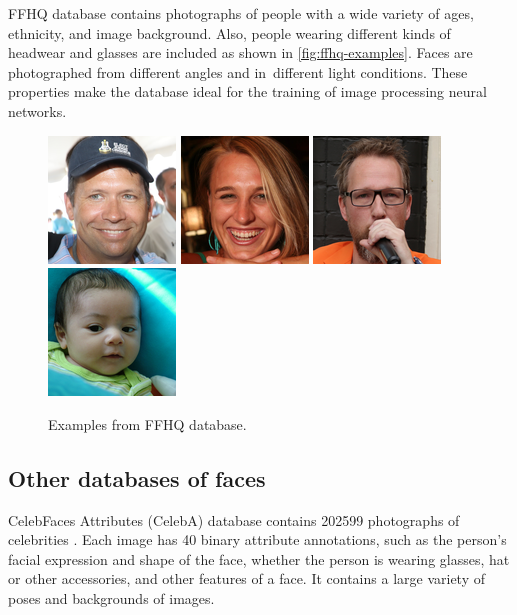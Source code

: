 FFHQ database contains photographs of people with a wide variety of ages, ethnicity, and image background. Also, people wearing different kinds of headwear and glasses are included as shown in \autoref{fig:ffhq-examples}. Faces are photographed from different angles and in~different light conditions. These properties make the database ideal for the training of image processing neural networks.

\begin{figure}[!h]
    \centering
    \includegraphics[scale=0.8]{figures/ffhq/example1_00011.png}
    \includegraphics[scale=0.8]{figures/ffhq/example2_00001.png}
    \includegraphics[scale=0.8]{figures/ffhq/example3_00005.png}
    \includegraphics[scale=0.8]{figures/ffhq/example4_00000.png}
    \caption{\label{fig:ffhq-examples}Examples from FFHQ database.}
\end{figure}

\subsection*{Other databases of faces}
CelebFaces Attributes (CelebA) database contains 202599 photographs of celebrities \cite{liu2015faceattributes}. Each image has 40 binary attribute annotations, such as the person's facial expression and shape of the face, whether the person is wearing glasses, hat or other accessories, and other features of a face. It contains a large variety of poses and backgrounds of images.

